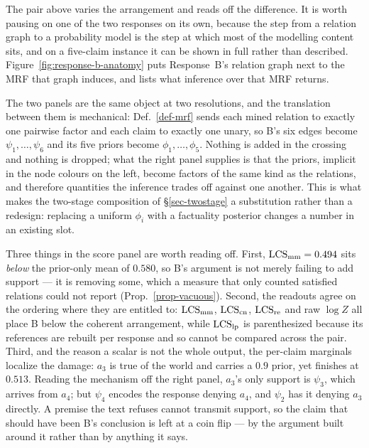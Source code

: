 

The pair above varies the arrangement and reads off the difference. It is worth pausing on one of
the two responses on its own, because the step from a relation graph to a probability model is the
step at which most of the modelling content sits, and on a five-claim instance it can be shown in
full rather than described. Figure~\ref{fig:response-b-anatomy} puts Response~B's relation graph
next to the MRF that graph induces, and lists what inference over that MRF returns.

The two panels are the same object at two resolutions, and the translation between them is
mechanical: Def.~\ref{def-mrf} sends each mined relation to exactly one pairwise factor and each
claim to exactly one unary, so B's six edges become $\psi_1,\dots,\psi_6$ and its five priors become
$\phi_1,\dots,\phi_5$. Nothing is added in the crossing and nothing is dropped; what the right panel
supplies is that the priors, implicit in the node colours on the left, become factors of the same
kind as the relations, and therefore quantities the inference trades off against one another. This
is what makes the two-stage composition of \S\ref{sec-twostage} a substitution rather than a
redesign: replacing a uniform $\phi_i$ with a factuality posterior changes a number in an existing
slot.

Three things in the score panel are worth reading off. First, $\mathrm{LCS}_{\mathrm{mm}}=0.494$ sits \emph{below}
the prior-only mean of $0.580$, so B's argument is not merely failing to add support --- it is
removing some, which a measure that only counted satisfied relations could not report
(Prop.~\ref{prop-vacuous}). Second, the readouts agree on the ordering where they are entitled to:
$\mathrm{LCS}_{\mathrm{mm}}$, $\mathrm{LCS}_{\mathrm{cn}}$, $\mathrm{LCS}_{\mathrm{re}}$ and raw $\log Z$ all place B below the coherent
arrangement, while $\mathrm{LCS}_{\mathrm{lp}}$ is parenthesized because its references are rebuilt per response and
so cannot be compared across the pair. Third, and the reason a scalar is not the whole output, the
per-claim marginals localize the damage: $a_3$ is true of the world and carries a $0.9$ prior, yet
finishes at $0.513$. Reading the mechanism off the right panel, $a_3$'s only support is $\psi_3$,
which arrives from $a_4$; but $\psi_4$ encodes the response denying $a_4$, and $\psi_2$ has it
denying $a_3$ directly. A premise the text refuses cannot transmit support, so the claim that
should have been B's conclusion is left at a coin flip --- by the argument built around it rather
than by anything it says.

